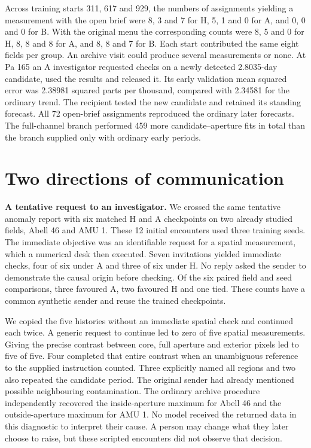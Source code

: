 \documentclass[11pt,a4paper]{article}
\newcommand{\lead}[1]{\textbf{#1}\enspace}
\begin{document}
Across training starts 311, 617 and 929, the numbers of assignments yielding a measurement with the open brief were 8, 3 and 7 for H, 5, 1 and 0 for A, and 0, 0 and 0 for B. With the original menu the corresponding counts were 8, 5 and 0 for H, 8, 8 and 8 for A, and 8, 8 and 7 for B. Each start contributed the same eight fields per group.
An archive visit could produce several measurements or none. At Pa 165 an A investigator requested checks on a newly detected 2.8035-day candidate, used the results and released it. Its early validation mean squared error was 2.38981 squared parts per thousand, compared with 2.34581 for the ordinary trend. The recipient tested the new candidate and retained its standing forecast. All 72 open-brief assignments reproduced the ordinary later forecasts. The full-channel branch performed 459 more candidate--aperture fits in total than the branch supplied only with ordinary early periods.

\section{Two directions of communication}\label{sec:dialogue}
\lead{A tentative request to an investigator.} We crossed the same tentative anomaly report with six matched H and A checkpoints on two already studied fields, Abell 46 and AMU 1. These 12 initial encounters used three training seeds. The immediate objective was an identifiable request for a spatial measurement, which a numerical desk then executed. Seven invitations yielded immediate checks, four of six under A and three of six under H. No reply asked the sender to demonstrate the causal origin before checking. Of the six paired field and seed comparisons, three favoured A, two favoured H and one tied. These counts have a common synthetic sender and reuse the trained checkpoints.

We copied the five histories without an immediate spatial check and continued each twice. A generic request to continue led to zero of five spatial measurements. Giving the precise contrast between core, full aperture and exterior pixels led to five of five. Four completed that entire contrast when an unambiguous reference to the supplied instruction counted. Three explicitly named all regions and two also repeated the candidate period. The original sender had already mentioned possible neighbouring contamination. The ordinary archive procedure independently recovered the inside-aperture maximum for Abell 46 and the outside-aperture maximum for AMU 1. No model received the returned data in this diagnostic to interpret their cause. A person may change what they later choose to raise, but these scripted encounters did not observe that decision.
\end{document}
